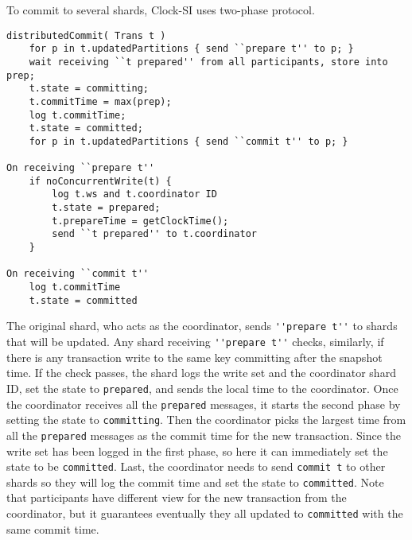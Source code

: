 To commit to several shards,
Clock-SI uses two-phase protocol.
\begin{lstlisting}[caption={Distributed Commit},label={lst:clock-si-distributed-commit}]
distributedCommit( Trans t )
    for p in t.updatedPartitions { send ``prepare t'' to p; }
    wait receiving ``t prepared'' from all participants, store into prep;
    t.state = committing;
    t.commitTime = max(prep);
    log t.commitTime;
    t.state = committed;
    for p in t.updatedPartitions { send ``commit t'' to p; }

On receiving ``prepare t''
    if noConcurrentWrite(t) {
        log t.ws and t.coordinator ID
        t.state = prepared;
        t.prepareTime = getClockTime();
        send ``t prepared'' to t.coordinator
    }

On receiving ``commit t''
    log t.commitTime
    t.state = committed
\end{lstlisting}
The original shard, who acts as the coordinator,
sends \verb|''prepare t''| to shards that will be updated.
Any shard receiving \verb|''prepare t''| checks, similarly, 
if there is any transaction write to the same key committing after the snapshot time.
If the check passes, 
the shard logs the write set and the coordinator shard ID,
set the state to \verb|prepared|,
and sends the local time to the coordinator.
Once the coordinator receives all the \verb|prepared| messages,
it starts the second phase by setting the state to \verb|committing|.
Then the coordinator picks the largest time from 
all the \verb|prepared| messages as the commit time for the new transaction.
Since the write set has been logged in the first phase, 
so here it can immediately set the state to be \verb|committed|.
Last, the coordinator needs to send \verb|commit t| to other shards 
so they will log the commit time and set the state to \verb|committed|.
Note that participants have different view for the new transaction from the coordinator,
but it guarantees eventually they all updated to \verb|committed| with the same commit time.

